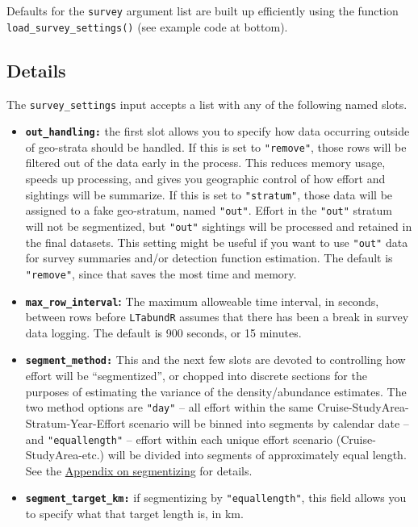 \documentclass[
]{book}
\begin{document}
Defaults for the \texttt{survey} argument list are built up efficiently using the function \texttt{load\_survey\_settings()} (see example code at bottom).

\hypertarget{details}{%
\subsection*{Details}\label{details}}

The \texttt{survey\_settings} input accepts a list with any of the following named slots.

\begin{itemize}
\item
  \textbf{\texttt{out\_handling:}} the first slot allows you to specify how data occurring outside of geo-strata should be handled. If this is set to \texttt{"remove"}, those rows will be filtered out of the data early in the process. This reduces memory usage, speeds up processing, and gives you geographic control of how effort and sightings will be summarize. If this is set to \texttt{"stratum"}, those data will be assigned to a fake geo-stratum, named \texttt{"out"}. Effort in the \texttt{"out"} stratum will not be segmentized, but \texttt{"out"} sightings will be processed and retained in the final datasets. This setting might be useful if you want to use \texttt{"out"} data for survey summaries and/or detection function estimation. The default is \texttt{"remove"}, since that saves the most time and memory.
\item
  \textbf{\texttt{max\_row\_interval}:} The maximum alloweable time interval, in seconds, between rows before \texttt{LTabundR} assumes that there has been a break in survey data logging. The default is 900 seconds, or 15 minutes.
\item
  \textbf{\texttt{segment\_method:}} This and the next few slots are devoted to controlling how effort will be ``segmentized'', or chopped into discrete sections for the purposes of estimating the variance of the density/abundance estimates. The two method options are \texttt{"day"} -- all effort within the same Cruise-StudyArea-Stratum-Year-Effort scenario will be binned into segments by calendar date -- and \texttt{"equallength"} -- effort within each unique effort scenario (Cruise-StudyArea-etc.) will be divided into segments of approximately equal length. See the \protect\hyperlink{segmentizing}{Appendix on segmentizing} for details.
\item
  \textbf{\texttt{segment\_target\_km:}} if segmentizing by \texttt{"equallength"}, this field allows you to specify what that target length is, in km.

\end{itemize}
\end{document}
